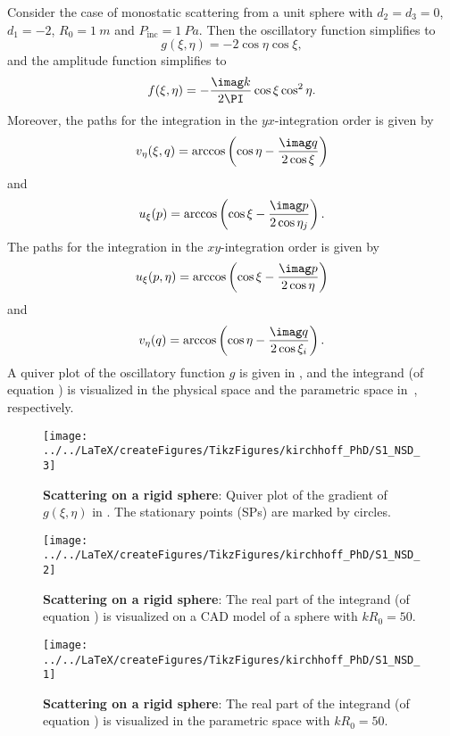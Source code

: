 Consider the case of monostatic scattering from a unit sphere with $d_2=d_3=0$, $d_1=-2$, $R_0=\SI{1}{m}$ and $P_{\mathrm{inc}}=\SI{1}{Pa}$. Then the oscillatory function simplifies to
\begin{equation}\label{Eq4:simplified_g}
	g(\xi,\eta)=-2\cos\eta\cos\xi,
\end{equation}
and the amplitude function simplifies to
\begin{equation}\label{Eq4:simplified_f}
	f(\xi,\eta) = -\frac{\imag k}{2\PI}\cos\xi\cos^2\eta.
\end{equation}
Moreover, the paths for the integration in the $yx$-integration order is given by
\begin{align*}
v_\eta(\xi,q) = \arccos\left(\cos\eta-\frac{\imag q}{2\cos\xi}\right)
\end{align*}
and
\begin{equation*}
	u_\xi(p) = \arccos\left(\cos\xi-\frac{\imag p}{2\cos\eta_j}\right).
\end{equation*}
The paths for the integration in the $xy$-integration order is given by
\begin{equation*}
	u_\xi(p,\eta) = \arccos\left(\cos\xi-\frac{\imag p}{2\cos\eta}\right)
\end{equation*}
and
\begin{align*}
v_\eta(q) = \arccos\left(\cos\eta-\frac{\imag q}{2\cos\xi_i}\right).
\end{align*}
A quiver plot of the oscillatory function $g$ is given in , and the integrand (of equation ) is visualized in the physical space and the parametric space in~, respectively.
\begin{figure}
	\centering
	\texttt{[image: ../../LaTeX/createFigures/TikzFigures/kirchhoff\_PhD/S1\_NSD\_3]}
	\caption{\textbf{Scattering on a rigid sphere}: Quiver plot of the gradient of $g(\xi,\eta)$ in . The stationary points (SPs) are marked by circles.}
	\label{Fig4:quiver_g}
\end{figure}
\begin{figure}
	\centering
	\texttt{[image: ../../LaTeX/createFigures/TikzFigures/kirchhoff\_PhD/S1\_NSD\_2]}
	\caption{\textbf{Scattering on a rigid sphere}: The real part of the integrand (of equation ) is visualized on a CAD model of a sphere with $kR_0=50$.}
	\label{Fig4:rigidSphereCAD}
\end{figure}
\begin{figure}
	\centering
	\texttt{[image: ../../LaTeX/createFigures/TikzFigures/kirchhoff\_PhD/S1\_NSD\_1]}
	\caption{\textbf{Scattering on a rigid sphere}: The real part of the integrand (of equation ) is visualized in the parametric space with $kR_0=50$.}
	\label{Fig4:rigidSphereParm}
\end{figure}

